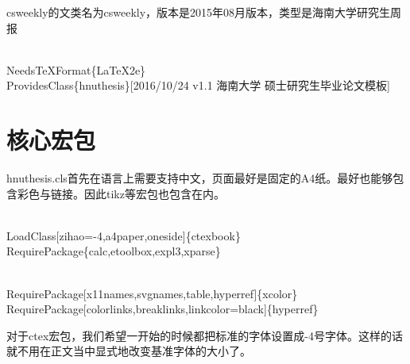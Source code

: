 \documentclass{hnuthesis}%
\begin{document}
csweekly的文类名为csweekly，版本是2015年08月版本，类型是海南大学研究生周报

\begin{nowebtrunk}
\nwenddocs{}\endmoddef\nwstartdeflinemarkup{}\nwenddeflinemarkup
\\NeedsTeXFormat\{LaTeX2e\}
\\ProvidesClass\{hnuthesis\}[2016/10/24 v1.1 海南大学 硕士研究生毕业论文模板]
\nwendcode{}\end{nowebtrunk}




\section{核心宏包}

hnuthesis.cls首先在语言上需要支持中文，页面最好是固定的A4纸。最好也能够包含彩色与链接。因此tikz等宏包也包含在内。
\begin{nowebtrunk}
\nwenddocs{}\endmoddef\nwstartdeflinemarkup{}\nwenddeflinemarkup
\\LoadClass[zihao=-4,a4paper,oneside]\{ctexbook\}
\\RequirePackage\{calc,etoolbox,expl3,xparse\}

\\RequirePackage[x11names,svgnames,table,hyperref]\{xcolor\}
\\RequirePackage[colorlinks,breaklinks,linkcolor=black]\{hyperref\}
\nwendcode{}\end{nowebtrunk}

对于ctex宏包，我们希望一开始的时候都把标准的字体设置成-4号字体。这样的话就不用在正文当中显式地改变基准字体的大小了。
\end{document}
